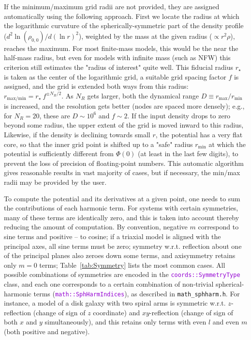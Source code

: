 \documentclass[12pt]{article}
\newcommand{\ttt}[1]{\textcolor{darkviolet}{\texttt{#1}}}
\begin{document}
If the minimum/maximum grid radii are not provided, they are assigned automatically using the following approach. First we locate the radius at which the logarithmic curvature of the spherically-symmetric part of the density profile ($d^2\ln(\rho_{0,0})/d(\ln r)^2$), weighted by the mass at the given radius ($\propto r^2\rho$), reaches the maximum. For most finite-mass models, this would be the near the half-mass radius, but even for models with infinite mass (such as NFW) this criterion still estimates the "radius of interest" quite well. This fiducial radius $r_\star$ is taken as the center of the logarithmic grid, a suitable grid spacing factor $f$ is assigned, and the grid is extended both ways from this radius: $r_\mathrm{max/min} = r_\star\: f^{\pm N_R/2}$. As $N_R$ gets larger, both the dynamical range $D\equiv r_\mathrm{max}/r_\mathrm{min}$ is increased, and the resolution gets better (nodes are spaced more densely); e.g., for $N_R=20$, these are $D\sim 10^6$ and $f\sim 2$. If the input density drops to zero beyond some radius, the upper extent of the grid is moved inward to this radius, Likewise, if the density is declining towards small $r$, the potential has a very flat core, so that the inner grid point is shifted up to a "safe" radius $r_\mathrm{min}$ at which the potential is sufficiently different from $\Phi(0)$ (at least in the last few digits), to prevent the loss of precision of floating-point numbers. This automatic algorithm gives reasonable results in vast majority of cases, but if necessary, the min/max radii may be provided by the user.

To compute the potential and its derivatives at a given point, one needs to sum the contributions of each harmonic term. For systems with certain symmetries, many of these terms are identically zero, and this is taken into account thereby reducing the amount of computation. By convention, negative $m$ correspond to sine terms and positive -- to cosine; if a triaxial model is aligned with the principal axes, all sine terms must be zero; symmetry w.r.t. reflection about one of the principal planes also zeroes down some terms, and axisymmetry retains only $m=0$ terms; Table~\ref{tab:Symmetry} lists the most common cases. All possible combinations of symmetries are encoded in the \ttt{coords::SymmetryType} class, and each one corresponds to a certain combination of non-trivial spherical-harmonic terms (\ttt{math::SphHarmIndices}), as described in \texttt{math_sphharm.h}. For instance, a model of a disk galaxy with two spiral arms is symmetric w.r.t. $z$-reflection (change of sign of $z$ coordinate) and $xy$-reflection (change of sign of both $x$ and $y$ simultaneously), and this retains only terms with even $l$ and even $m$ (both positive and negative).
\end{document}
